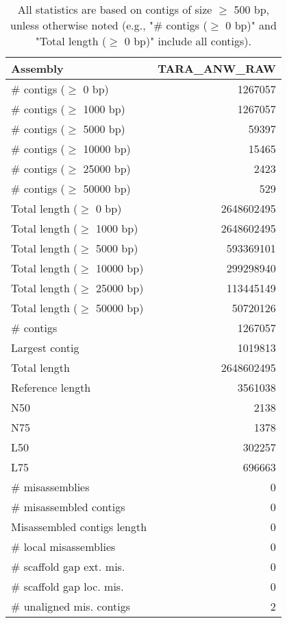 \documentclass[12pt,a4paper]{article}
\begin{document}
\begin{table}[ht]
\begin{center}
\caption{All statistics are based on contigs of size $\geq$ 500 bp, unless otherwise noted (e.g., "\# contigs ($\geq$ 0 bp)" and "Total length ($\geq$ 0 bp)" include all contigs).}
\begin{tabular}{|l*{1}{|r}|}
\hline
Assembly & TARA\_ANW\_RAW \\ \hline
\# contigs ($\geq$ 0 bp) & 1267057 \\ \hline
\# contigs ($\geq$ 1000 bp) & 1267057 \\ \hline
\# contigs ($\geq$ 5000 bp) & 59397 \\ \hline
\# contigs ($\geq$ 10000 bp) & 15465 \\ \hline
\# contigs ($\geq$ 25000 bp) & 2423 \\ \hline
\# contigs ($\geq$ 50000 bp) & 529 \\ \hline
Total length ($\geq$ 0 bp) & 2648602495 \\ \hline
Total length ($\geq$ 1000 bp) & 2648602495 \\ \hline
Total length ($\geq$ 5000 bp) & 593369101 \\ \hline
Total length ($\geq$ 10000 bp) & 299298940 \\ \hline
Total length ($\geq$ 25000 bp) & 113445149 \\ \hline
Total length ($\geq$ 50000 bp) & 50720126 \\ \hline
\# contigs & 1267057 \\ \hline
Largest contig & 1019813 \\ \hline
Total length & 2648602495 \\ \hline
Reference length & 3561038 \\ \hline
N50 & 2138 \\ \hline
N75 & 1378 \\ \hline
L50 & 302257 \\ \hline
L75 & 696663 \\ \hline
\# misassemblies & 0 \\ \hline
\# misassembled contigs & 0 \\ \hline
Misassembled contigs length & 0 \\ \hline
\# local misassemblies & 0 \\ \hline
\# scaffold gap ext. mis. & 0 \\ \hline
\# scaffold gap loc. mis. & 0 \\ \hline
\# unaligned mis. contigs & 2 \\ \hline

\end{tabular}
\end{center}
\end{table}
\end{document}
